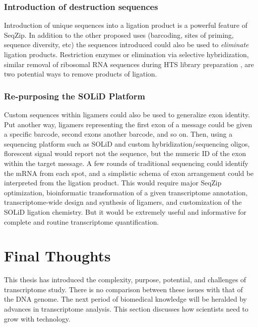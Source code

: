     \subsubsection{Introduction of destruction sequences}
      \label{Disc:subsubsec:Intro of Desctruction Sequences}

      Introduction of unique sequences into a ligation product is a powerful feature of SeqZip. In addition to the other proposed uses (barcoding, sites of priming, sequence diversity, etc) the sequences introduced could also be used to \textit{eliminate} ligation products. Restriction enzymes or elimination via selective hybridization, similar removal of ribosomal RNA sequences during HTS library preparation \citep{Chen2011a}, are two potential ways to remove products of ligation.

    \subsubsection{Re-purposing the SOLiD Platform}
      \label{Disc:subsubsec:SOLiD Platform for SeqZip}

      Custom sequences within ligamers could also be used to generalize exon identity. Put another way, ligamers representing the first exon of a message could be given a specific barcode, second exons another barcode, and so on. Then, using a sequencing platform such as SOLiD and custom hybridization/sequencing oligos, florescent signal would report not the sequence, but the numeric ID of the exon within the target message. A few rounds of traditional sequencing could identify the mRNA from each spot, and a simplistic schema of exon arrangement could be interpreted from the ligation product. This would require major SeqZip optimization, bioinformatic transformation of a given transcriptome annotation, transcriptome-wide design and synthesis of ligamers, and customization of the SOLiD ligation chemistry. But it would be extremely useful and informative for complete and routine transcriptome quantification.

\section{Final Thoughts}
  \label{Disc:sec:Final Thoughts}

  This thesis has introduced the complexity, purpose, potential, and challenges of transcriptome study. There is no comparison between these issues with that of the DNA genome. The next period of biomedical knowledge will be heralded by advances in transcriptome analysis. This section discusses how scientists need to grow with technology.

